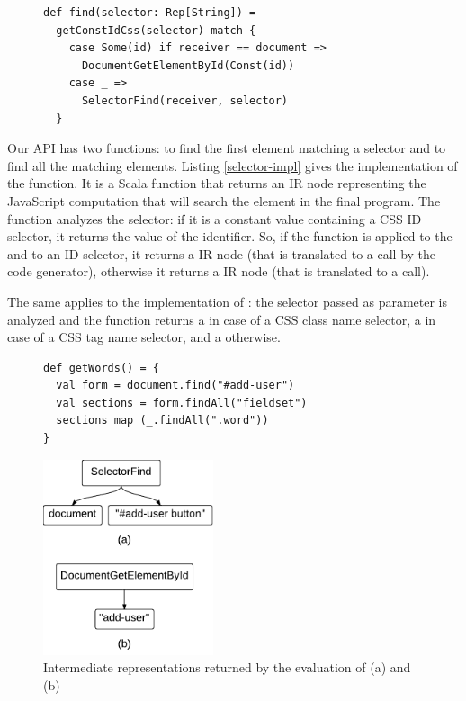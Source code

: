 \documentclass[preprint]{sigplanconf}
\begin{document}
\begin{figure}[htb]
\begin{lstlisting}[label=selector-impl,caption=Selectors optimization]
def find(selector: Rep[String]) =
  getConstIdCss(selector) match {
    case Some(id) if receiver == document =>
      DocumentGetElementById(Const(id))
    case _ =>
      SelectorFind(receiver, selector)
  }
\end{lstlisting}
\end{figure}

Our API has two functions:  to find the first element matching a selector and
 to find all the matching elements. Listing \ref{selector-impl} gives the
implementation of the  function. It is a Scala function that returns an IR node
representing the JavaScript computation that will search the element in the final program. The
 function analyzes the selector: if it is a constant  value
containing a CSS ID selector, it returns the value of the identifier. So, if the 
function is applied to the  and to an ID selector, it returns a
 IR node (that is translated to a  call
by the code generator), otherwise it returns a  IR node (that is translated to a
 call).

The same applies to the implementation of : the selector passed as parameter is
analyzed and the function returns a  in case of a CSS class
name selector, a  in case of a CSS tag name selector, and a
 otherwise.

\begin{figure}[htb]
\begin{lstlisting}[label=js-scala-selectors,caption=Searching elements in js-scala]
def getWords() = {
  val form = document.find("#add-user")
  val sections = form.findAll("fieldset")
  sections map (_.findAll(".word"))
}
\end{lstlisting}
\end{figure}

\begin{figure}[htb]
\begin{center}
\includegraphics[width=5cm]{ir.pdf}
\end{center}
\caption{Intermediate representations returned by the evaluation of (a)
 and (b) }
\label{fig:ir}
\end{figure}
\end{document}
